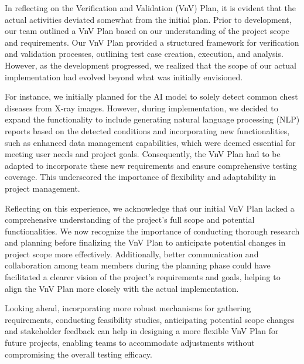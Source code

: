 \documentclass[12pt, titlepage]{article}
\begin{document}

In reflecting on the Verification and Validation (VnV) Plan, it is evident that the actual activities deviated somewhat from the initial plan. Prior to development, our team outlined a VnV Plan based on our understanding of the project scope and requirements. Our VnV Plan provided a structured framework for verification and validation processes, outlining test case creation, execution, and analysis. However, as the development progressed, we realized that the scope of our actual implementation had evolved beyond what was initially envisioned.

For instance, we initially planned for the AI model to solely detect common chest diseases from X-ray images. However, during implementation, we decided to expand the functionality to include generating natural language processing (NLP) reports based on the detected conditions and incorporating new functionalities, such as enhanced data management capabilities, which were deemed essential for meeting user needs and project goals. Consequently, the VnV Plan had to be adapted to incorporate these new requirements and ensure comprehensive testing coverage. This underscored the importance of flexibility and adaptability in project management.

Reflecting on this experience, we acknowledge that our initial VnV Plan lacked a comprehensive understanding of the project's full scope and potential functionalities. We now recognize the importance of conducting thorough research and planning before finalizing the VnV Plan to anticipate potential changes in project scope more effectively. Additionally, better communication and collaboration among team members during the planning phase could have facilitated a clearer vision of the project's requirements and goals, helping to align the VnV Plan more closely with the actual implementation.

Looking ahead, incorporating more robust mechanisms for gathering requirements, conducting feasibility studies, anticipating potential scope changes and stakeholder feedback can help in designing a more flexible VnV Plan for future projects, enabling teams to accommodate adjustments without compromising the overall testing efficacy.
\end{document}
